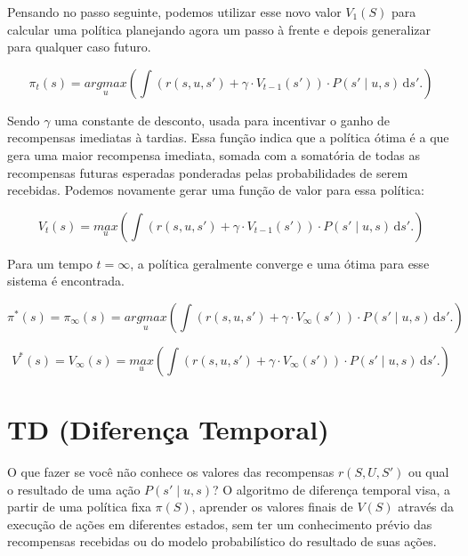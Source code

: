 Pensando no passo seguinte, podemos utilizar esse novo valor $ V_1 \left( S \right) $ para calcular uma política planejando agora um passo à frente e depois generalizar para qualquer caso futuro.

\begin{equation}
    \pi_t \left( s \right) = \underset{u}{argmax} \left( \int \! \left( r \left( s, u, s' \right) + \gamma \cdot V_{t-1} \left( s' \right) \right) \cdot P \left( s' \mid u, s \right) \, \mathrm{d}s'. \right)
\end{equation}

Sendo $ \gamma $ uma constante de desconto, usada para incentivar o ganho de recompensas imediatas à tardias. Essa função indica que a política ótima é a que gera uma maior recompensa imediata, somada com a somatória de todas as recompensas futuras esperadas ponderadas pelas probabilidades de serem recebidas. Podemos novamente gerar uma função de valor para essa política:

\begin{equation}
    V_t \left( s \right) = \underset{u}{max} \left( \int \! \left( r \left( s, u, s' \right) + \gamma \cdot V_{t-1} \left( s' \right) \right) \cdot P \left( s' \mid u, s \right) \, \mathrm{d}s'. \right)
\end{equation}

Para um tempo $ t = \infty $, a política geralmente converge e uma ótima para esse sistema é encontrada.

\begin{equation}
    \pi^* \left( s \right) = \pi_\infty \left( s \right) = \underset{u}{argmax} \left( \int \! \left( r \left( s, u, s' \right) + \gamma \cdot V_\infty \left( s' \right) \right) \cdot P \left( s' \mid u, s \right) \, \mathrm{d}s'. \right)
\end{equation}

\begin{equation} \label{equation:ValueFunctionMDP}
    V^* \left( s \right) = V_\infty \left( s \right) = \underset{u}{max} \left( \int \! \left( r \left( s, u, s' \right) + \gamma \cdot V_\infty \left( s' \right) \right) \cdot P \left( s' \mid u, s \right) \, \mathrm{d}s'. \right)
\end{equation}


\section{TD (Diferença Temporal)} \label{section:TD}

O que fazer se você não conhece os valores das recompensas $ r \left( S, U, S' \right) $ ou qual o resultado de uma ação $ P \left( s' \mid u, s \right) $? O algoritmo de diferença temporal visa, a partir de uma política fixa $ \pi \left( S \right) $, aprender os valores finais de $ V \left( S \right) $ através da execução de ações em diferentes estados, sem ter um conhecimento prévio das recompensas recebidas ou do modelo probabilístico do resultado de suas ações.

